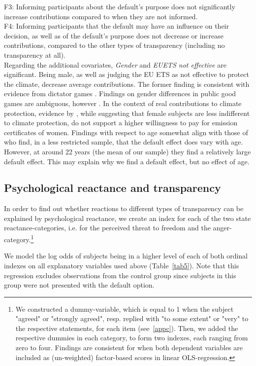 \documentclass[review, authoryear,12pt]{elsarticle}
\begin{document}
F3: Informing participants about the default's purpose does not significantly increase contributions compared to when they are not informed.\\

F4: Informing participants that the default may have an influence on their decision, as well as of the default's purpose does not decrease or increase contributions, compared to the other types of transparency (including no transparency at all).\\

Regarding the additional covariates, \textit{Gender} and \textit{EUETS not effective} are significant. Being male, as well as judging the EU ETS as not effective to protect the climate, decrease average contributions. The former finding is consistent with evidence from dictator games \citep{Engel.2011}. Findings on gender differences in public good games are ambiguous, however \citep{Croson.2009}. In the context of real contributions to climate protection, evidence by \cite{Diederich.2014}, while suggesting that female subjects are less indifferent to climate protection, do not support a higher willingness to pay for emission certificates of women. Findings with respect to age somewhat align with those of \cite{Borghans.2015} who find, in a less restricted sample, that the default effect does vary with age. However, at around 22 years (the mean of our sample) they find a relatively large default effect. This may explain why we find a default effect, but no effect of age.

\subsection{Psychological reactance and transparency}
In order to find out whether reactions to different types of transparency can be explained by psychological reactance, we create an index for each of the two state reactance-categories, i.e. for the perceived threat to freedom and the anger-category.\footnote{We constructed a dummy-variable, which is equal to 1 when the subject "agreed" or "strongly agreed", resp. replied with "to some extent" or "very" to the respective statements, for each item (see~\ref{appc}). Then, we added the respective dummies in each category, to form two indexes, each ranging from zero to four. Findings are consistent for when both dependent variables are included as (un-weighted) factor-based scores in linear OLS-regression.}

We model the log odds of subjects being in a higher level of each of both ordinal indexes on all explanatory variables used above (Table~\ref{tab5}). Note that this regression excludes observations from the control group since subjects in this group were not presented with the default option.
\end{document}

